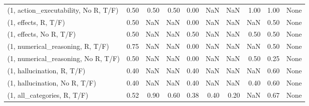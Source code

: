 \begin{table*}[h!]
\begin{adjustbox}{width=2\columnwidth,center}
\begin{tabular}{lrrr|rrr|rrr}
(1, action\_executability, No R, T/F) &                      0.50 &                  0.50 &                      0.50 &                          0.00 &                       NaN &                           NaN &                                   1.00 &                               1.00 &                                  None \\
(1, effects, R, T/F)                 &                      0.50 &                   NaN &                       NaN &                          0.00 &                       NaN &                           NaN &                                    NaN &                               0.50 &                                  None \\
(1, effects, No R, T/F)              &                      0.50 &                   NaN &                       NaN &                          0.50 &                       NaN &                           NaN &                                   0.50 &                               0.50 &                                  None \\
(1, numerical\_reasoning, R, T/F)     &                      0.75 &                   NaN &                       NaN &                          0.00 &                       NaN &                           NaN &                                    NaN &                               0.50 &                                  None \\
(1, numerical\_reasoning, No R, T/F)  &                      0.50 &                   NaN &                       NaN &                          0.00 &                       NaN &                           NaN &                                   0.50 &                               0.25 &                                  None \\
(1, hallucination, R, T/F)           &                      0.40 &                   NaN &                       NaN &                          0.40 &                       NaN &                           NaN &                                    NaN &                               0.60 &                                  None \\
(1, hallucination, No R, T/F)        &                      0.40 &                   NaN &                       NaN &                          0.40 &                       NaN &                           NaN &                                   0.40 &                               0.60 &                                  None \\
(1, all\_categories, R, T/F)          &                      0.52 &                  0.90 &                      0.60 &                          0.38 &                      0.40 &                          0.20 &                                    NaN &                               0.67 &                                  None \\

\end{tabular}
\end{adjustbox}
\end{table*}
